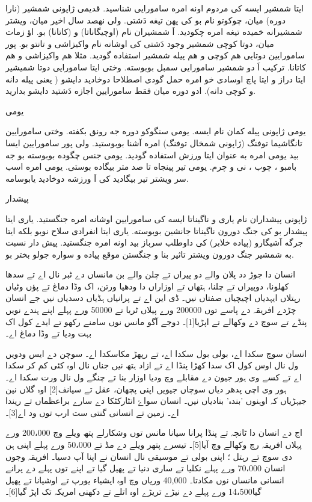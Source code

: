 \documentclass[a4paper]{article}
\begin{document}
\begin{flushright}
ایتا شمشیر ایسه کی مردوم اونه امره سامورایی شناسید. قدیمی ژاپونی شمشیر (نارا دوره) میان، چوکوتو نام بو کی پهن تیغه دَشتی. ولی نهصد سال اخیر میان، ویشتر شمشیرانه خمیده تیغه امره چکودید. اَ شمشیران نام (اوچیگاناتا) و (کاتانا) بو. اؤ زمات میان، دوتا کوچی شمشیر وجود دَشتی کی اوشانه نام واکیزاشی و تانتو بو. پور سامورایین دوتایی هم کوچی و هم پیله شمشیر استفاده گودید. مثلا هم واکیزاشی و هم کاتانا. ترکیب اَ دو شمشیر سامورایی سمبل بوبوسته. وختی ایتا سامورایی دوتا شمیشیر ایتا دراز و ایتا پاچ اوسادی خو امره حمل گودی اصطلاحا دوخادید دایشو ( یعنی پیله دانه و کوچی دانه). ادو دوره میان فقط سامورایین اجازه دَشتید دایشو بدارید.

یومی

یومی ژاپونی پیله کمان نام ایسه. یومی سنگوكو دوره جه رونق بکفته. وختی سامورایین تانگاشیما توفنگ (ژاپونی شمخال توفنگ) امره آشنا بوبوستید. ولی پور سامورایین ایسا بید یومی امره به عنوان ایتا ورزش استفاده گودید. یومی جنس چگوده بوبوسته بو جه بامبو ، چوب ، نی و چرم. یومی تیر پینجاه تا صد متر بیگاده بوستی. یومی امره اسب سر ویشتر تیر بیگادید کی اَ ورزشه دوخادید یابوسامه.

پیشدار

ژاپونی پیشداران نام یاری و ناگیناتا ایسه کی سامورایین اوشانه امره جنگستید. یاری ایتا پیشدار بو کی جنگ دورون ناگیناتا جانشین بوبوسته. یاری ایتا انفرادی سلاح نوبو بلکه ایتا جرگه آشیگارو (پیاده خلابر) کی داوطلب سرباز بید اونه امره جنگستید. پیش دار نسبت به شمشیر جنگ دورون ویشتر تاثیر بنا و جنگستن موقع پیاده و سواره جولو بختر بو.

انسان دا جوڑ دد پلان والے دو پیراں تے چلن والے بن مانساں دے ٹبر نال اے تے سدھا کھلونا، دوپیراں تے چلنا، ہتھاں تے اوزاراں دا ودھیا ورتن، اک وڈا دماغ تے پؤں وٹیاں رہتلاں ایہدیاں اچیچیاں صفتاں نیں۔ ڈی این اے تے پرانیاں ہڈیاں دسدیاں نیں جے انسان چڑدے افریقہ دے پاسے توں 200000 ورے پیلاں ٹریا تے 50000 ورے پہلے اپنے ہندے نویں پنڈے تے سوچ دے وکھالے تے اپڑیا[1]۔ دوجے آگو مانس نوں سامنے رکھو تے ایدے کول اک بہت ودیا تے وڈا دماغ اے۔



انسان سوچ سکدا اے، بولی بول سکدا اے، تے رپھڑ مکاسکدا اے۔ سوچن دے ایس ودویں ول نال اوس کول اک سدا کھڑا پنڈا اے تے ازاد ہتھ نیں جناں نال اوہ کئی کم کر سکدا اے تے کسے وی ہور جیون دے مقابلے وچ ودیا اوزار بنا تے چنگے ول نال ورت سکدا اے۔ ہور وی اچی پدھر دیاں سوچاں جیویں اپنی پچھان، عقل تے سیانف[2] اوہ گلاں نین جیہڑیاں کہ اوہنوں 'بندہ' بنادیاں نیں۔ انسان سواۓ انٹارکٹکا دے سارے براعظماں تے ریندا اے۔ زمین تے انسانی گنتی ست ارب توں ود اے[3]۔

اج دے انسان دا ٹانچہ تے پنڈا پرانا سیانا مانس توں وشکارلے پتھ ویلے وچ 200،000 ورے پہلاں افریقہ رچ وکھالے وچ آیا[5]۔ تیسرے پتھر ویلے دے مڈ تے 50،000 ورے پہلے اپنی ہن دی سوچ تے رہتل ؛ اپنی بولی تے موسیقی نال انسان نے اپنا آپ دسیا۔ افریقہ وجوں انسان 70،000 ورے پہلے نکلیا تے ساری دنیا تے پھیل گیا تے اپنے توں پہلے دے پرانے انسانی مانساں نوں مکادتا۔ 40,000 وریاں وچ اوہ ایشیاء یورپ تے اوشیانا تے پھیل گیا14،500 ورے پہلے دے نیڑے تریڑے اوہ اتلے تے دکھنی امریکہ تک اپڑ گیا[6]۔




\end{flushright}
\end{document}
